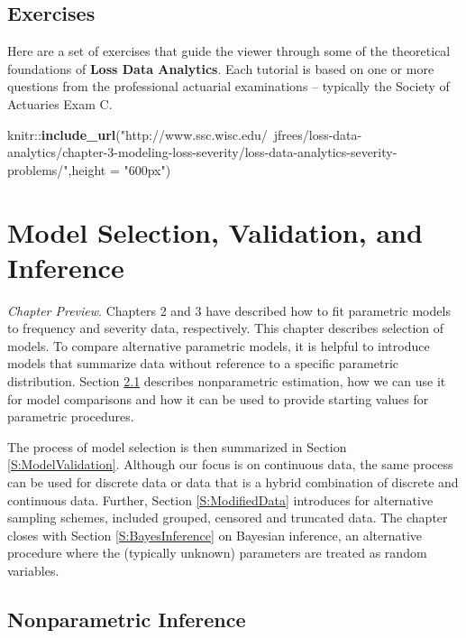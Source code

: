\documentclass[]{book}
\newenvironment{Shaded}{\begin{snugshade}}{\end{snugshade}}
\newcommand{\KeywordTok}[1]{\textcolor[rgb]{0.13,0.29,0.53}{\textbf{{#1}}}}
\newcommand{\DataTypeTok}[1]{\textcolor[rgb]{0.13,0.29,0.53}{{#1}}}
\newcommand{\StringTok}[1]{\textcolor[rgb]{0.31,0.60,0.02}{{#1}}}
\newcommand{\NormalTok}[1]{{#1}}
\theoremstyle{definition}
\theoremstyle{definition}
\theoremstyle{definition}
\theoremstyle{remark}
\begin{document}
\section{Exercises}\label{exercises-1}

Here are a set of exercises that guide the viewer through some of the
theoretical foundations of \textbf{Loss Data Analytics}. Each tutorial
is based on one or more questions from the professional actuarial
examinations -- typically the Society of Actuaries Exam C.

\begin{Shaded}
\begin{Highlighting}[]
\NormalTok{knitr::}\KeywordTok{include_url}\NormalTok{(}\StringTok{"http://www.ssc.wisc.edu/~jfrees/loss-data-analytics/chapter-3-modeling-loss-severity/loss-data-analytics-severity-problems/"}\NormalTok{,}\DataTypeTok{height =} \StringTok{"600px"}\NormalTok{)}
\end{Highlighting}
\end{Shaded}

\chapter{Model Selection, Validation, and
Inference}\label{model-selection-validation-and-inference}

\emph{Chapter Preview}. Chapters 2 and 3 have described how to fit
parametric models to frequency and severity data, respectively. This
chapter describes selection of models. To compare alternative parametric
models, it is helpful to introduce models that summarize data without
reference to a specific parametric distribution. Section
\ref{S:NonParInf} describes nonparametric estimation, how we can use it
for model comparisons and how it can be used to provide starting values
for parametric procedures.

The process of model selection is then summarized in Section
\ref{S:ModelValidation}. Although our focus is on continuous data, the
same process can be used for discrete data or data that is a hybrid
combination of discrete and continuous data. Further, Section
\ref{S:ModifiedData} introduces for alternative sampling schemes,
included grouped, censored and truncated data. The chapter closes with
Section \ref{S:BayesInference} on Bayesian inference, an alternative
procedure where the (typically unknown) parameters are treated as random
variables.

\section{Nonparametric Inference}\label{S:NonParInf}
\end{document}
